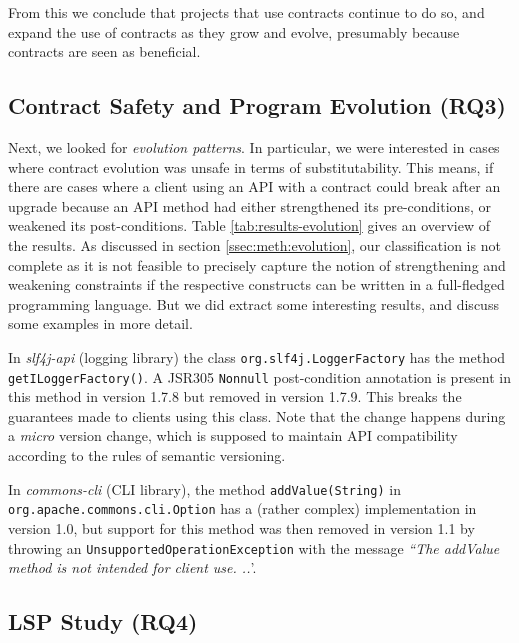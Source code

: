 \documentclass[a4paper,UKenglish]{lipics-v2016}
\begin{document}
From this we conclude that projects that use contracts continue to do so, and expand the use of contracts as they grow and evolve, presumably because contracts are seen as beneficial.

\subsection{Contract Safety and Program Evolution (RQ3)}

Next, we looked for \textit{evolution patterns}. In particular, we were interested in cases where contract evolution was unsafe in terms of substitutability. This means, if there are cases where a client using an API with a contract could break after an upgrade because an API method had either strengthened its pre-conditions, or weakened its post-conditions.  Table \ref{tab:results-evolution} gives an overview of the results. As discussed in section \ref{ssec:meth:evolution}, our classification is not complete as it is not feasible to precisely capture the notion of strengthening and weakening constraints if the respective constructs can be written in a full-fledged programming language. But we did extract some interesting results, and discuss some examples in more detail.



In \textit{slf4j-api} (logging library) the class \texttt{org.\-slf4j.LoggerFactory}
has the method \texttt{get\-ILogger\-Factory()}. A JSR305 \texttt{Nonnull} post-condition annotation is present in this method in	version 1.7.8 but removed in version 1.7.9. This breaks the guarantees made to clients using this class. Note that the change happens during a {\em micro} version change, which is supposed to maintain API compatibility according to the rules of semantic versioning. 

In \textit{commons-cli} (CLI library), the method \texttt{add\-Value(String)} in \texttt{org.\-apache.\-commons.\-cli.\-Option} has a (rather complex) implementation in version 1.0, but support for this method was then removed in version 1.1 by throwing an \texttt{UnsupportedOperationException} with the message \textit{``The addValue method is not intended for client use. ..}'. 


\subsection{LSP Study (RQ4)}
\label{ssec:results:lsp}
\end{document}
